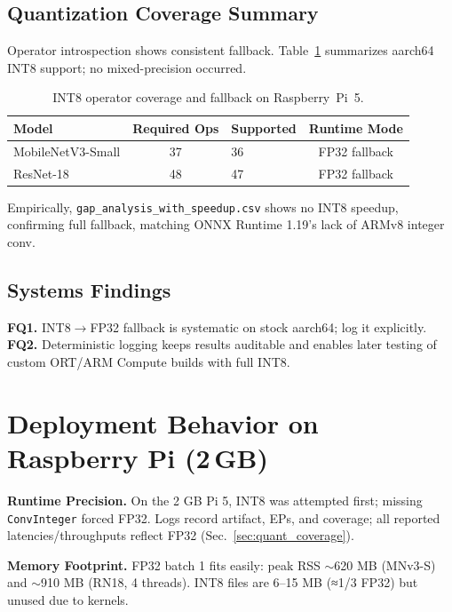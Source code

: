 \documentclass{article}
\begin{document}
\subsection{Quantization Coverage Summary}
Operator introspection shows consistent fallback.  
Table~\ref{tab:quant_cov} summarizes aarch64 INT8 support; no mixed-precision occurred.

\begin{table}[h]
  \centering
  \caption{INT8 operator coverage and fallback on Raspberry~Pi~5.}
  \label{tab:quant_cov}
  \footnotesize
  \begin{tabularx}{\columnwidth}{l c X c}
    \toprule
    Model & Required Ops & Supported & Runtime Mode \\
    \midrule
    MobileNetV3-Small & 37 & 36 & FP32 fallback \\
    ResNet-18         & 48 & 47 & FP32 fallback \\
    \bottomrule
  \end{tabularx}
\end{table}

Empirically, \texttt{gap\_analysis\_with\_speedup.csv} shows no INT8 speedup, confirming full fallback, matching ONNX Runtime 1.19’s lack of ARMv8 integer conv.

\subsection{Systems Findings}
\textbf{FQ1.} INT8$\rightarrow$FP32 fallback is systematic on stock aarch64; log it explicitly.  
\textbf{FQ2.} Deterministic logging keeps results auditable and enables later testing of custom ORT/ARM Compute builds with full INT8.

\section{Deployment Behavior on Raspberry Pi (2\,GB)}
\label{sec:deployment}

\textbf{Runtime Precision.}
On the 2 GB Pi 5, INT8 was attempted first; missing \texttt{ConvInteger} forced FP32.  
Logs record artifact, EPs, and coverage; all reported latencies/throughputs reflect FP32 (Sec.~\ref{sec:quant_coverage}).

\textbf{Memory Footprint.}
FP32 batch 1 fits easily: peak RSS $\sim$620 MB (MNv3-S) and $\sim$910 MB (RN18, 4 threads).  
INT8 files are 6–15 MB (≈1/3 FP32) but unused due to kernels.
\end{document}
